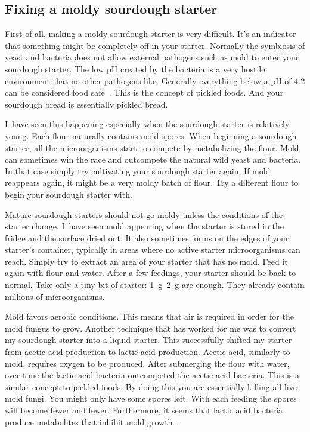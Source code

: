 \subsection{Fixing a moldy sourdough starter}

First of all, making a moldy sourdough starter is very difficult.
It's an indicator that something might be completely off in your starter.
Normally the symbiosis of yeast and bacteria does not allow external
pathogens such as mold to enter your sourdough starter.
The low pH created by the bacteria is a very hostile environment
that no other pathogens like. Generally everything below a pH
of 4.2 can be considered food safe~\cite{food+safe+ph}. This
is the concept of pickled foods. And your sourdough bread
is essentially pickled bread.

I~have seen this happening especially when the sourdough
starter is relatively young. Each flour naturally contains
mold spores. When beginning a sourdough starter, all
the microorganisms start to compete by metabolizing the
flour. Mold can sometimes win the race and outcompete
the natural wild yeast and bacteria. In that case simply
try cultivating your sourdough starter again. If mold reappears
again, it might be a very moldy batch of flour. Try a different
flour to begin your sourdough starter with.

Mature sourdough starters should not go moldy unless the conditions
of the starter change. I~have seen mold appearing when the starter is stored
in the fridge and the surface dried out. It also sometimes forms on the
edges of your starter's container, typically in areas where no active
starter microorganisms can reach. Simply try to extract an
area of your starter that has no mold. Feed it again with flour and
water. After a few feedings, your starter should be back to normal.
Take only a tiny bit of starter: \qtyrange{1}{2}{\gram} are enough. They already
contain millions of microorganisms.

Mold favors aerobic conditions. This means that air is required in order
for the mold fungus to grow. Another technique that has worked for me
was to convert my sourdough starter into a liquid starter. This successfully
shifted my starter from acetic acid production to lactic acid production.
Acetic acid, similarly to mold, requires oxygen to be produced. After
submerging the flour with water, over time the lactic acid bacteria
outcompeted the acetic acid bacteria. This is a similar concept to pickled
foods. By doing this you are essentially killing all live mold fungi. You
might only have some spores left. With each feeding the spores will become
fewer and fewer. Furthermore, it seems that lactic acid bacteria produce
metabolites that inhibit mold growth~\cite{mold+lactic+acid+bacteria}.

